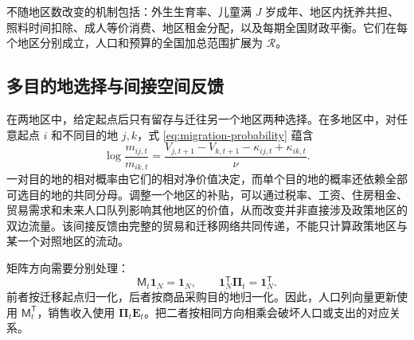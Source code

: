 \documentclass[UTF8,a4paper,zihao=-4,fontset=windows]{ctexart}
\numberwithin{equation}{section}
\begin{document}
不随地区数改变的机制包括：外生生育率、儿童满 $J$ 岁成年、地区内抚养共担、照料时间扣除、成人等价消费、地区租金分配，以及每期全国财政平衡。它们在每个地区分别成立，人口和预算的全国加总范围扩展为 $\mathcal R$。

\subsection{多目的地选择与间接空间反馈}
在两地区中，给定起点后只有留存与迁往另一个地区两种选择。在多地区中，对任意起点 $i$ 和不同目的地 $j,k$，式 \eqref{eq:migration-probability} 蕴含
\begin{equation}
  \log\frac{m_{ij,t}}{m_{ik,t}}
   =\frac{V_{j,t+1}-V_{k,t+1}
           -\kappa_{ij,t}+\kappa_{ik,t}}{\nu}.
  \label{eq:app-multinomial-odds}
\end{equation}
一对目的地的相对概率由它们的相对净价值决定，而单个目的地的概率还依赖全部可选目的地的共同分母。调整一个地区的补贴，可以通过税率、工资、住房租金、贸易需求和未来人口队列影响其他地区的价值，从而改变并非直接涉及政策地区的双边流量。该间接反馈由完整的贸易和迁移网络共同传递，不能只计算政策地区与某一个对照地区的流动。

矩阵方向需要分别处理：
\begin{equation}
  \mathsf M_t\mathbf 1_N=\mathbf 1_N,\qquad
  \mathbf 1_N^{\mathsf T}\bm\Pi_t=\mathbf 1_N^{\mathsf T}.
  \label{eq:app-network-orientation}
\end{equation}
前者按迁移起点归一化，后者按商品采购目的地归一化。因此，人口列向量更新使用 $\mathsf M_t^{\mathsf T}$，销售收入使用 $\bm\Pi_t\mathbf E_t$。把二者按相同方向相乘会破坏人口或支出的对应关系。
\end{document}
